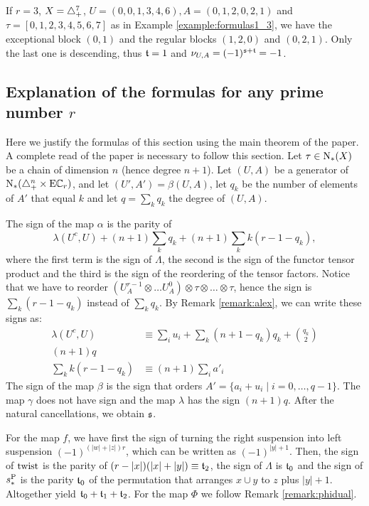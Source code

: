 \begin{example}
	If $r=3$, $X= \triangle_{+}^7$, $U = (0,0,1,3,4,6), A = (0,1,2,0,2,1)$ and $\tau = [0,1,2,3,4,5,6,7]$ as in Example \ref{example:formulas1_3}, we have the exceptional block $(0,1)$ and the regular blocks $(1,2,0)$ and $(0,2,1)$. Only the last one is descending, thus $\mathfrak{t} = 1$ and $\nu_{U,A} = (-1)^{\mathfrak{s}+\mathfrak{t}} = -1$.
\end{example}

\subsection{Explanation of the formulas for any prime number \texorpdfstring{$r$}{r}} Here we justify the formulas of this section using the main theorem of the paper. A complete read of the paper is necessary to follow this section. Let $\tau\in \operatorname{N}_{*}(X)$ be a chain of dimension $n$ (hence degree $n+1$). Let $(U,A)$ be a generator of $\operatorname{N}_{*}(\triangle_{+}^n\times \mathrm{E}\mathbb{C}_r)$, and let $(U',A') = \beta(U,A)$, let $q_k$ be the number of elements of $A'$ that equal $k$ and let $q = \sum_{k}q_k$ the degree of $(U,A)$.

The sign of the map $\alpha$ is the parity of 
\[
	\lambda(U^c,U) + (n+1)\sum_k q_k + (n+1)\sum_kk(r-1-q_k),
\]
where the first term is the sign of $\Lambda$, the second is the sign of the functor tensor product and the third is the sign of the reordering of the tensor factors. Notice that we have to reorder $(U^{r-1}_A\otimes \ldots U^0_A)\otimes \tau\otimes\ldots\otimes \tau$, hence the sign is $\sum_k(r-1-q_k)$ instead of $\sum_k q_k$. By Remark \ref{remark:alex}, we can write these signs as:
\begin{align}
\label{signo:lambda}	\lambda(U^c,U) &\equiv \sum_i u_i + \sum_k(n+1-q_k)q_k + \binom{q_k}{2}
\\
\label{signo:prod} (n+1)q
\\
 \label{signo:reord} \sum_kk(r-1-q_k)&\equiv (n+1)\sum_{i} a'_i
\end{align}
The sign of the map $\beta$ is the sign that orders $A'  = \{a_i+u_i\mid i=0,\ldots,q-1\}$. The map $\gamma$ does not have sign and the map $\lambda$ has the sign $(n+1)q$. After the natural cancellations, we obtain $\mathfrak{s}$.

For the map $f$, we have first the sign of turning the right suspension into left suspension $(-1)^{(|w|+|z|)r}$, which can be written as $(-1)^{|y|+1}$. Then, the sign of $\operatorname{twist}$ is the parity of $(r-|x|)(|x|+|y|) \equiv \mathfrak{t}_2$, the sign of $\Lambda$ is $\mathfrak{t}_0$ and the sign of $s_*^{\operatorname{P}}$ is the parity $\mathfrak{t}_0$ of the permutation that arranges $x\cup y$ to $z$ plus $|y|+1$. Altogether yield $\mathfrak{t}_0+\mathfrak{t}_1+\mathfrak{t}_2$. For the map $\Phi$ we follow Remark \ref{remark:phidual}.
